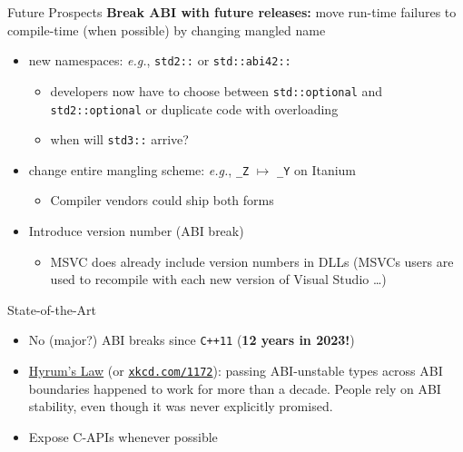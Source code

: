 \begin{frame}
    \centering
    \scalebox{3}{Future Prospects}
\end{frame}

\begin{frame}{Future Prospects}
    \textbf{Break ABI with future releases:} move run-time failures to compile-time (when possible) by changing mangled name

    \begin{itemize}
        \item new namespaces: \textit{e.g.}, \texttt{std2::} or \texttt{std::abi42::}
        \begin{itemize}
            \item developers now have to choose between \texttt{std::optional} and \texttt{std2::optional} or duplicate code with overloading
            \item when will \texttt{std3::} arrive?
        \end{itemize}
        \item change entire mangling scheme: \textit{e.g.}, \texttt{\_Z} $\mapsto$ \texttt{\_Y} on Itanium
        \begin{itemize}
            \item Compiler vendors could ship both forms
        \end{itemize}
        \item Introduce version number (ABI break)
        \begin{itemize}
            \item MSVC does already include version numbers in DLLs (MSVCs users are used to recompile with each new version of Visual Studio \ldots)
        \end{itemize}
    \end{itemize}
\end{frame}

\begin{frame}{State-of-the-Art}
    \begin{itemize}
        \item No (major?) ABI breaks since \texttt{C++11} (\textbf{12 years in 2023!})
        \item \href{https://www.hyrumslaw.com/}{Hyrum's Law} (or \href{https://xkcd.com/1172/}{\texttt{xkcd.com/1172}}): passing ABI-unstable types across ABI boundaries happened to work for more than a decade. People rely on ABI stability, even though it was never explicitly promised.
        \item Expose C-APIs whenever possible
    \end{itemize}
\end{frame}

